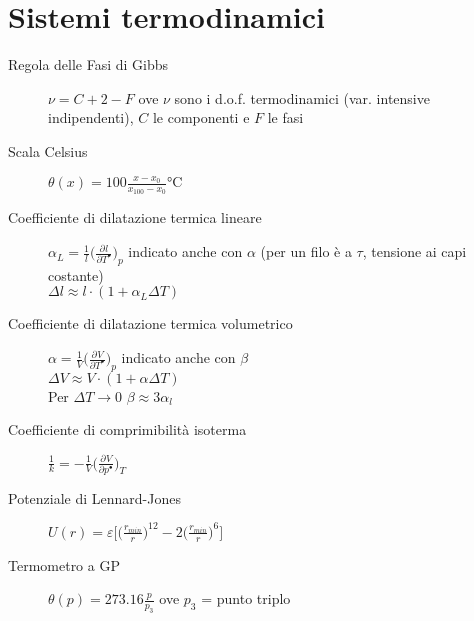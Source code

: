 \documentclass[10pt, oneside]{article}
\begin{document}
\section{Sistemi termodinamici}
\begin{description}
\item[Regola delle Fasi di Gibbs] $\displaystyle \nu = C + 2 - F$ ove $\nu$ sono i d.o.f. termodinamici (var. intensive indipendenti), $C$ le componenti e $F$ le fasi
\item[Scala Celsius] $\displaystyle \theta (x) = 100 \frac{x - x_0}{x_{100} - x_0} \mathrm{°C}$
\item[Coefficiente di dilatazione termica lineare] $\displaystyle \alpha_L = \frac{1}{l} \bigg(\frac{\partial^{} l}{\partial T^{•}}\bigg)_p$ indicato anche con $\alpha$ (per un filo è a $\tau$, tensione ai capi costante)
\\ $\displaystyle \Delta l \approx l \cdot (1 + \alpha_L \Delta T)$
\item[Coefficiente di dilatazione termica volumetrico] $\displaystyle \alpha =  \frac{1}{V} \bigg(\frac{\partial^{} V}{\partial T^{•}}\bigg)_p$ indicato anche con $\beta$
\\ $\displaystyle \Delta V \approx V \cdot (1 + \alpha \Delta T)$
\\ Per $\Delta T \rightarrow 0$ $\beta \approx 3 \alpha_l$
\item[Coefficiente di comprimibilità isoterma] $\displaystyle \frac{1}{k} = -  \frac{1}{V} \bigg(\frac{\partial^{}V}{\partial p^{•}}\bigg)_T$
\item[Potenziale di Lennard-Jones] $\displaystyle U(r) = \varepsilon \bigg[\big(\frac{r_{min}}{r}\big)^{12} - 2 \big(\frac{r_{min}}{r}\big)^6\bigg]$
\item[Termometro a GP] $\displaystyle \theta(p) = 273.16 \frac{p}{p_3}$ ove $p_3$ = punto triplo
\end{description}
\end{document}
